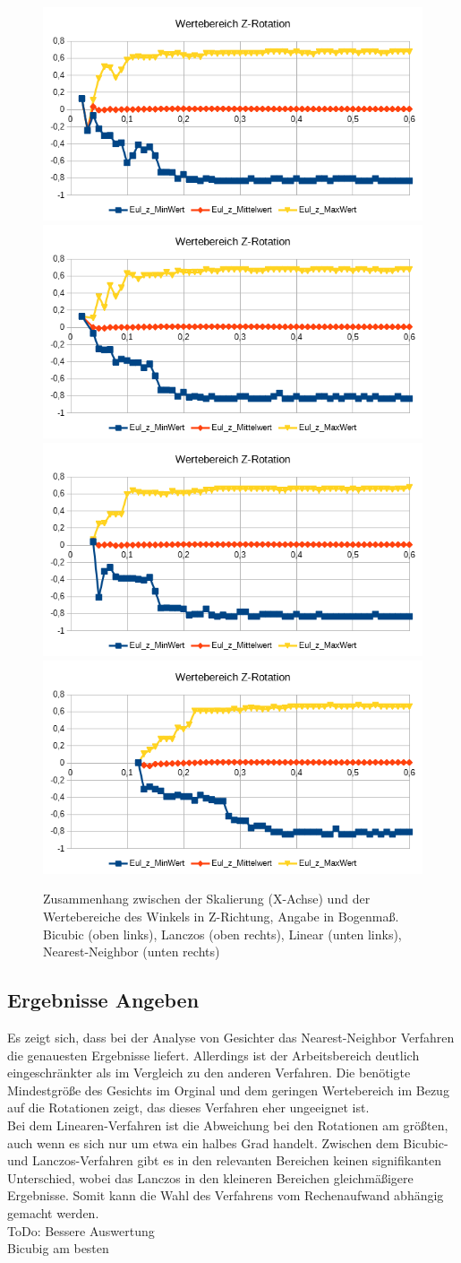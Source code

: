 \begin{figure}
	\centering
	\includegraphics[width=0.45\linewidth]{tabelle2/Z_Rot_Val_Cubic}
	\includegraphics[width=0.45\linewidth]{tabelle2/Z_Rot_Val_Lanc}
	\includegraphics[width=0.45\linewidth]{tabelle2/Z_Rot_Val_Linear}
	\includegraphics[width=0.45\linewidth]{tabelle2/Z_Rot_Val_NN}
	\caption{Zusammenhang zwischen der Skalierung (X-Achse) und der Wertebereiche des Winkels in Z-Richtung, Angabe in Bogenmaß.
		Bicubic (oben links), Lanczos (oben rechts), Linear (unten links), Nearest-Neighbor (unten rechts)}
	\label{img_Z_Rot_Val_Skal}
\end{figure}
\subsection{Ergebnisse Angeben}
Es zeigt sich, dass bei der Analyse von Gesichter das Nearest-Neighbor Verfahren die genauesten Ergebnisse liefert. Allerdings ist der Arbeitsbereich deutlich eingeschränkter als im Vergleich zu den anderen Verfahren. Die benötigte Mindestgröße des Gesichts im Orginal und dem geringen Wertebereich im Bezug auf die Rotationen zeigt, das dieses Verfahren eher ungeeignet ist.\\
Bei dem Linearen-Verfahren ist die Abweichung bei den Rotationen am größten, auch wenn es sich nur um etwa ein halbes Grad handelt. Zwischen dem Bicubic- und Lanczos-Verfahren gibt es in den relevanten Bereichen keinen signifikanten Unterschied, wobei das Lanczos in den kleineren Bereichen gleichmäßigere Ergebnisse. Somit kann die Wahl des Verfahrens vom Rechenaufwand abhängig gemacht werden.\\
ToDo: Bessere Auswertung\\
Bicubig am besten